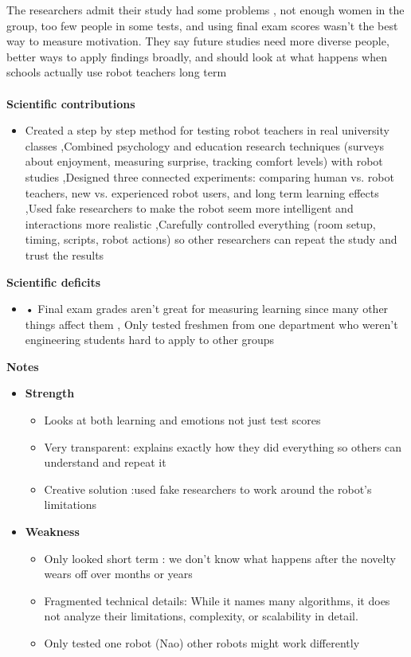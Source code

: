 \documentclass[report.tex]{subfiles}
\begin{document}
The researchers admit their study had some problems  ,  not enough women in the group, too few people in some tests, and using final exam scores wasn't the best way to measure motivation. They say future studies need more diverse people, better ways to apply findings broadly, and should look at what happens when schools actually use robot teachers long term
\\\\




\noindent\textbf{Scientific contributions} 
\begin{itemize}
        \item  Created a step by step method for testing robot teachers in real university classes ,Combined psychology and education research techniques (surveys about enjoyment, measuring surprise, tracking comfort levels) with robot studies ,Designed three connected experiments: comparing human vs. robot teachers, new vs. experienced robot users, and long term learning effects ,Used fake researchers to make the robot seem more intelligent and interactions more realistic ,Carefully controlled everything (room setup, timing, scripts, robot actions) so other researchers can repeat the study and trust the results
        
\end{itemize}

\noindent\textbf{Scientific deficits} 
\begin{itemize}
        \item     • Final exam grades aren't great for measuring learning since many other things affect them , Only tested freshmen from one department who weren't engineering students   hard to apply to other groups
\end{itemize}

\noindent\textbf{Notes}
\begin{itemize}
    \item \noindent\textbf {Strength}
    \begin{itemize}
        \item Looks at both learning and emotions  not just test scores 
        \item Very transparent:   explains exactly how they did everything so others can understand and repeat it 
        \item Creative solution  :used fake researchers to work around the robot's limitations
    \end{itemize}
    
    \item \noindent\textbf{Weakness}
    \begin{itemize}
        \item Only looked short term : we don't know what happens after the novelty wears off over months or years 
        \item Fragmented technical details: While it names many algorithms, it does not analyze their limitations, complexity, or scalability in detail.
        \item  Only tested one robot (Nao)  other robots might work differently
    \end{itemize}
\end{itemize}
\end{document}
